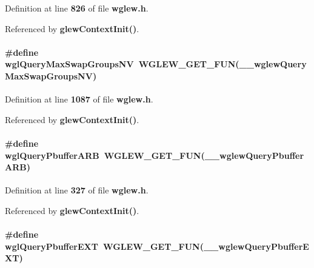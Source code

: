 Definition at line {\bf 826} of file {\bf wglew.\+h}.



Referenced by {\bf glew\+Context\+Init()}.

\paragraph[{wgl\+Query\+Max\+Swap\+Groups\+NV}]{\setlength{\rightskip}{0pt plus 5cm}\#define wgl\+Query\+Max\+Swap\+Groups\+NV~{\bf W\+G\+L\+E\+W\+\_\+\+G\+E\+T\+\_\+\+F\+UN}({\bf \+\_\+\+\_\+wglew\+Query\+Max\+Swap\+Groups\+NV})}\label{wglew_8h_a5a05072b45261bf1077f8fc1e98a2bfc}


Definition at line {\bf 1087} of file {\bf wglew.\+h}.



Referenced by {\bf glew\+Context\+Init()}.

\paragraph[{wgl\+Query\+Pbuffer\+A\+RB}]{\setlength{\rightskip}{0pt plus 5cm}\#define wgl\+Query\+Pbuffer\+A\+RB~{\bf W\+G\+L\+E\+W\+\_\+\+G\+E\+T\+\_\+\+F\+UN}({\bf \+\_\+\+\_\+wglew\+Query\+Pbuffer\+A\+RB})}\label{wglew_8h_a5e6ee5d9b4bc75b0446c06e228740e91}


Definition at line {\bf 327} of file {\bf wglew.\+h}.



Referenced by {\bf glew\+Context\+Init()}.

\paragraph[{wgl\+Query\+Pbuffer\+E\+XT}]{\setlength{\rightskip}{0pt plus 5cm}\#define wgl\+Query\+Pbuffer\+E\+XT~{\bf W\+G\+L\+E\+W\+\_\+\+G\+E\+T\+\_\+\+F\+UN}({\bf \+\_\+\+\_\+wglew\+Query\+Pbuffer\+E\+XT})}\label{wglew_8h_a69a04f2ec57a63ee3140c798d778a544}


